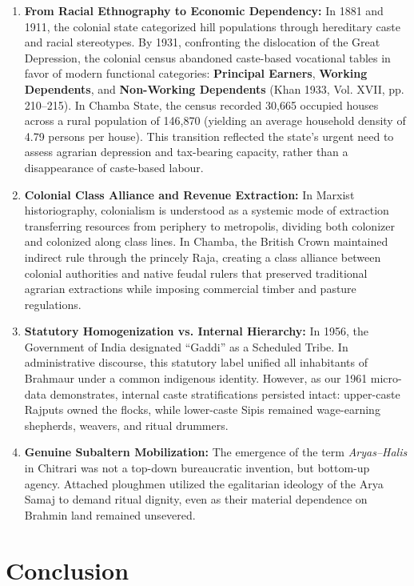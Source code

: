 \documentclass[11pt,a4paper]{article}
\begin{document}
\begin{enumerate}[leftmargin=*]
    \item \textbf{From Racial Ethnography to Economic Dependency:} In 1881 and 1911, the colonial state categorized hill populations through hereditary caste and racial stereotypes. By 1931, confronting the dislocation of the Great Depression, the colonial census abandoned caste-based vocational tables in favor of modern functional categories: \textbf{Principal Earners}, \textbf{Working Dependents}, and \textbf{Non-Working Dependents} (Khan 1933, Vol. XVII, pp. 210--215). In Chamba State, the census recorded 30,665 occupied houses across a rural population of 146,870 (yielding an average household density of 4.79 persons per house). This transition reflected the state's urgent need to assess agrarian depression and tax-bearing capacity, rather than a disappearance of caste-based labour.
    \item \textbf{Colonial Class Alliance and Revenue Extraction:} In Marxist historiography, colonialism is understood as a systemic mode of extraction transferring resources from periphery to metropolis, dividing both colonizer and colonized along class lines. In Chamba, the British Crown maintained indirect rule through the princely Raja, creating a class alliance between colonial authorities and native feudal rulers that preserved traditional agrarian extractions while imposing commercial timber and pasture regulations.
    \item \textbf{Statutory Homogenization vs. Internal Hierarchy:} In 1956, the Government of India designated ``Gaddi'' as a Scheduled Tribe. In administrative discourse, this statutory label unified all inhabitants of Brahmaur under a common indigenous identity. However, as our 1961 micro-data demonstrates, internal caste stratifications persisted intact: upper-caste Rajputs owned the flocks, while lower-caste Sipis remained wage-earning shepherds, weavers, and ritual drummers.
    \item \textbf{Genuine Subaltern Mobilization:} The emergence of the term \textit{Aryas--Halis} in Chitrari was not a top-down bureaucratic invention, but bottom-up agency. Attached ploughmen utilized the egalitarian ideology of the Arya Samaj to demand ritual dignity, even as their material dependence on Brahmin land remained unsevered.
\end{enumerate}

\section{Conclusion}
\end{document}
